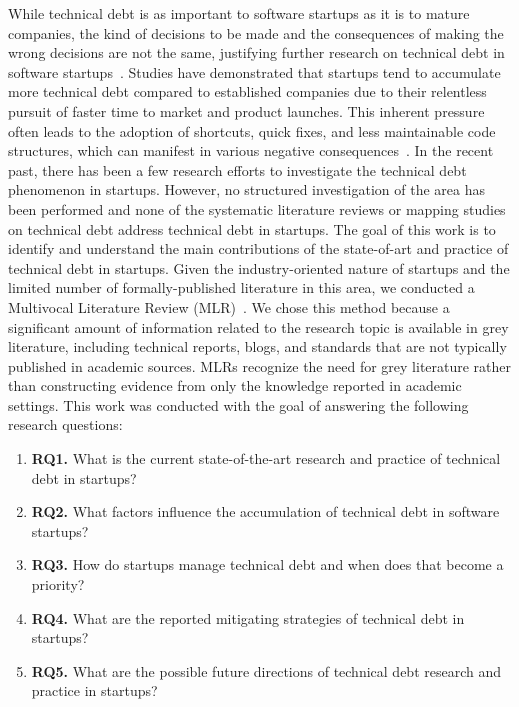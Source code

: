 While technical debt is as important to software startups as it is to mature companies, the kind of decisions to be made and the consequences of making the wrong decisions are not the same, justifying further research on technical debt in software startups~\cite{Unterkalmsteiner16}.
Studies have demonstrated that startups tend to accumulate more technical debt compared to established companies due to their relentless pursuit of faster time to market and product launches.
This inherent pressure often leads to the adoption of shortcuts, quick fixes, and less maintainable code structures, which can manifest in various negative consequences~\cite{Giardino2016,Klotins882019}.
In the recent past, there has been a few research efforts to investigate the technical debt phenomenon in startups.
However, no structured investigation of the area has been performed and none of the systematic literature reviews or mapping studies on technical debt address technical debt in startups.
The goal of this work is to identify and understand the main contributions of the state-of-art and practice of technical debt in startups.
Given the industry-oriented nature of startups and the limited number of formally-published literature in this area, we conducted a Multivocal Literature Review (MLR)~\cite{GAROUSI2019101}.
We chose this method because a significant amount of information related to the research topic is available in grey literature, including technical reports, blogs, and standards that are not typically published in academic sources.
MLRs recognize the need for grey literature rather than constructing evidence from only the knowledge reported in academic settings.
This work was conducted with the goal of answering the following research questions:
\begin{enumerate}
\item \textbf{RQ1.} What is the current state-of-the-art research and practice of technical debt in startups?
\item \textbf{RQ2.} What factors influence the accumulation of technical debt in software startups?
\item \textbf{RQ3.} How do startups manage technical debt and when does that become a priority?
\item \textbf{RQ4.} What are the reported mitigating strategies of technical debt in startups?
\item \textbf{RQ5.} What are the possible future directions of technical debt research and practice in startups?
\end{enumerate}


